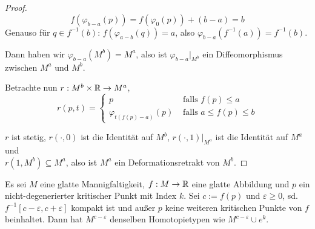 \begin{proof}
    \[ f(\varphi_{b - a}(p)) = f(\varphi_{0}(p)) + (b - a) = b \]
    Genauso für $q \in f^{-1}(b)$: $f(\varphi_{a - b}(q)) = a$, also 
    $\varphi_{b - a}(f^{-1}(a)) = f^{-1}(b)$.

    Dann haben wir $\varphi_{b - a} (M^b) = M^a$, also ist $\varphi_{b - a}|_{M^b}$ ein 
    Diffeomorphismus zwischen $M^a$ und $M^b$. 

    Betrachte nun $r: M^b \times { \mathbb R } \to M^a$,
    \[  
        r(p, t) = \begin{cases}
            p & \text{ falls }  f(p) \leq a \\
            \varphi_{t(f(p) - a)}(p) & \text{ falls } a \leq f(p) \leq b 
        \end{cases}
    \]

    $r$ ist stetig, $r(\cdot, 0)$ ist die Identität auf $M^b$, $r(\cdot, 1)|_{M^a}$ ist die 
    Identität auf $M^a$ und \\ $r(1, M^b) \subseteq M^a$, also ist $M^a$ ein Deformationsretrakt 
    von 
    $M^b$.
\end{proof}

\begin{theorem}
    \label{satz: zweites deformationslemma}
    Es sei $M$ eine glatte Mannigfaltigkeit, $f: M \rightarrow { \mathbb R }$ eine glatte
    Abbildung und $p$ ein nicht-degenerierter kritischer Punkt mit Index 
    $k$. Sei $c := f(p)$ und $\varepsilon \geq 0$, sd. 
    $f^{-1}[c - \varepsilon, c + \varepsilon]$ kompakt ist und außer $p$ keine 
    weiteren kritischen Punkte von $f$ beinhaltet. Dann hat $M^{c-\varepsilon}$
    denselben Homotopietypen wie $M^{c - \varepsilon} \cup e^k$.
\end{theorem}

